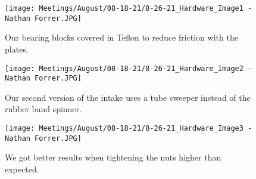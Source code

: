 \begin{figure}[ht]
\centering
\begin{minipage}[b]{.48\textwidth}
  \centering
  \texttt{[image: Meetings/August/08-18-21/8-26-21\_Hardware\_Image1 - Nathan Forrer.JPG]}
  \caption{Our bearing blocks covered in Teflon to reduce friction with the plates.}
  \label{fig:pic1}
\end{minipage}%
\hfill%
\begin{minipage}[b]{.48\textwidth}
  \centering
  \texttt{[image: Meetings/August/08-18-21/8-26-21\_Hardware\_Image2 - Nathan Forrer.JPG]}
  \caption{Our second version of the intake uses a tube sweeper instead of the rubber band spinner.}
  \label{fig:pic2}
\end{minipage}
\end{figure}

\begin{figure}[htp]
\centering
\texttt{[image: Meetings/August/08-18-21/8-26-21\_Hardware\_Image3 - Nathan Forrer.JPG]}
\caption{We got better results when tightening the nuts higher than expected.}
\label{fig:pic3}
\end{figure}